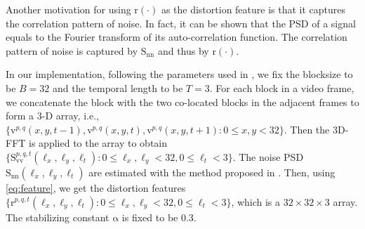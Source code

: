 \documentclass{sig-alternate}
\begin{document}
Another motivation for using $\mathrm{r}(\cdot)$ as the distortion feature is that it captures the correlation pattern of noise. In fact, it can be shown that the PSD of a signal equals to the Fourier transform of its auto-correlation function. The correlation pattern of noise is captured by $\mathrm{S_{nn}}$ and thus by $\mathrm{r}(\cdot)$. 

In our implementation, following the parameters used in \cite{KokKelDenCra2016}, we fix the blocksize to be $B=32$ and the temporal length to be $T=3$. For each block in a video frame, we concatenate the block with the two co-located blocks in the adjacent frames to form a 3-D array, i.e., $\{\mathrm{v}^{p,q}(x,y,t-1),\mathrm{v}^{p,q}(x,y,t),\mathrm{v}^{p,q}(x,y,t+1): 0\leq x,y<32\}$. Then the 3D-FFT is applied to the array to obtain $\{\mathrm{S}_\mathrm{vv}^{p,q,t}(\ell_x,\ell_y,\ell_t):0\leq\ell_x,\ell_y<32,0\leq\ell_t<3\}$. The noise PSD $\mathrm{S_{nn}}(\ell_x,\ell_y,\ell_t)$ are estimated with the method proposed in \cite{KokKelDenCra2016}. Then, using \eqref{eq:feature}, we get the distortion features $\{\mathrm{r}^{p,q,t}(\ell_x,\ell_y,\ell_t):0\leq \ell_x,\ell_y < 32, 0\leq \ell_t<3\}$, which is a $32\times32\times3$ array. The stabilizing constant $\mathrm{\alpha}$ is fixed to be $0.3$.
\end{document}
